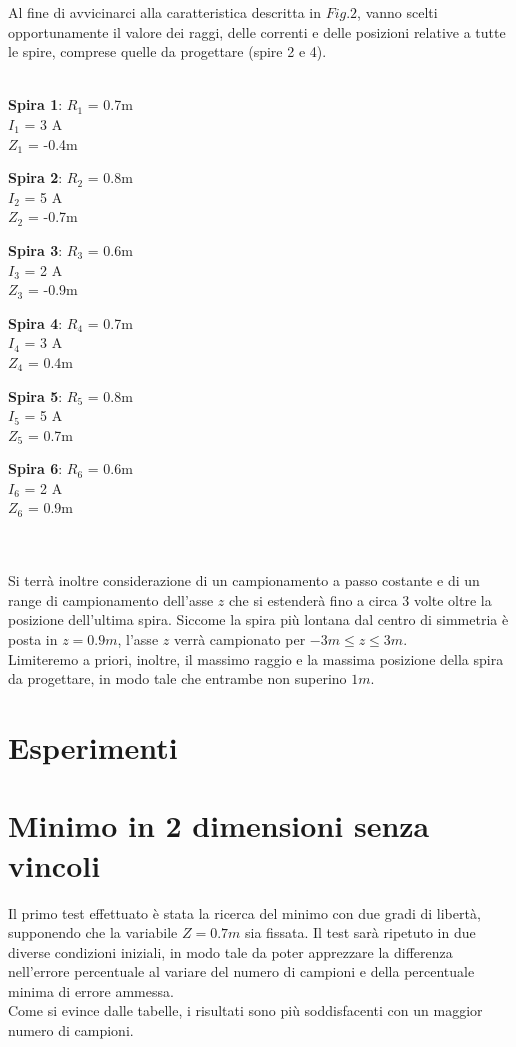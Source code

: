 \documentclass[a4paper, 11pt]{article}
\begin{document}
Al fine di avvicinarci alla caratteristica descritta in $Fig. 2$, vanno scelti
opportunamente il valore dei raggi, delle correnti e delle posizioni relative a
tutte le spire, comprese quelle da progettare (spire 2 e 4). \\ \\
\centerline{ \textbf{Spira 1}: $R_{1}$ = 0.7m \\ $I_{1}$ = 3 A \\ $Z_{1}$ = -0.4m} 
\centerline{ \textbf{Spira 2}: $R_{2}$ = 0.8m \\ $I_{2}$ = 5 A \\ $Z_{2}$ = -0.7m}
\centerline{ \textbf{Spira 3}: $R_{3}$ = 0.6m \\ $I_{3}$ = 2 A \\ $Z_{3}$ = -0.9m}
\centerline{ \textbf{Spira 4}: $R_{4}$ = 0.7m \\ $I_{4}$ = 3 A \\ $Z_{4}$ = 0.4m}
\centerline{ \textbf{Spira 5}: $R_{5}$ = 0.8m \\ $I_{5}$ = 5 A \\ $Z_{5}$ = 0.7m}
\centerline{ \textbf{Spira 6}: $R_{6}$ = 0.6m \\ $I_{6}$ = 2 A \\ $Z_{6}$ = 0.9m}
\\ \\
\noindent
Si terrà inoltre considerazione di un campionamento a passo costante e di un
range di campionamento dell'asse $z$ che si estenderà fino a circa 3 volte oltre
la posizione dell'ultima spira. Siccome la spira più lontana dal centro di
simmetria è posta in $z = 0.9 m$, l'asse $z$ verrà campionato per $-3 m \le z
\le 3 m$. \\
Limiteremo a priori, inoltre, il massimo raggio e la massima posizione della
spira da progettare, in modo tale che entrambe non superino $1 m$.

\section*{Esperimenti}
\section{Minimo in 2 dimensioni senza vincoli}

Il primo test effettuato è stata la ricerca del minimo con due gradi di libertà,
supponendo che la variabile $Z = 0.7m$ sia fissata. Il test sarà ripetuto in due
diverse condizioni iniziali, in modo tale da poter apprezzare la differenza
nell'errore percentuale al variare del numero di campioni e della percentuale
minima di errore ammessa. \\
Come si evince dalle tabelle, i risultati sono più soddisfacenti con un maggior
numero di campioni.
\end{document}
